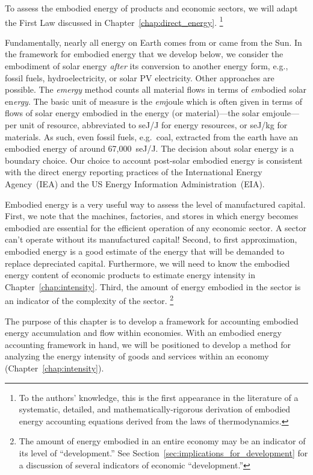 To assess the embodied energy of products and economic sectors,
we will adapt the First Law discussed in Chapter~\ref{chap:direct_energy}.%
	\footnote{  %
	To the authors' knowledge, 
	this is the first appearance in the literature 
	of a systematic, detailed, and mathematically-rigorous derivation 
	of embodied energy accounting equations derived from the 
	laws of thermodynamics.
	}

Fundamentally, nearly all energy on Earth comes from or came from the Sun.
In the framework for embodied energy that we develop below,
we consider the embodiment of solar energy \emph{after} its conversion
to another energy form, e.g., 
fossil fuels, 
hydroelectricity, or 
solar PV electricity.
Other approaches are possible.  
The \emph{emergy} method counts all material flows 
in terms of \emph{em}bodied solar en\emph{ergy}.\cite{Odum1975, Odum1996}
The basic unit of measure is 
the \emph{em}joule which is often given in terms 
of flows of solar energy embodied in 
the energy (or material)---the solar emjoule---per unit of resource, 
abbreviated to seJ/J for energy resources, 
or seJ/kg for materials. 
As such, even fossil fuels, e.g.\ coal, 
extracted from the earth have an embodied energy 
of around 67,000~seJ/J.\cite{Brown2004}
The decision about solar energy is a boundary choice.
Our choice to account post-solar embodied energy 
is consistent with the direct energy reporting practices
of the International Energy Agency~(IEA)
and the US Energy Information Administration~(EIA).

Embodied energy is a very useful way to assess the level of manufactured capital.
First, we note that 
the machines, factories, and stores in which energy becomes embodied
are essential for the efficient operation of any economic sector.
A sector can't operate without its manufactured capital!
Second, to first approximation, 
embodied energy is a good estimate of the energy that will be demanded to 
replace depreciated capital.
Furthermore, we will need to know the embodied energy content
of economic products to estimate energy intensity in 
Chapter~\ref{chap:intensity}.
Third, the amount of energy embodied in the sector 
is an indicator of the complexity of
the sector.%
	\footnote{  %
	The amount of energy embodied in an entire economy
	may be an indicator of its level of 
	``development.''
	See Section~\ref{sec:implications_for_development} for a
	discussion of several indicators of economic ``development.''
	}

The purpose of this chapter is to develop a framework for accounting
embodied energy accumulation and flow within economies. 
With an embodied energy accounting framework in hand, we will be positioned
to develop a method for analyzing the energy intensity 
of goods and services within an economy 
(Chapter~\ref{chap:intensity}).


